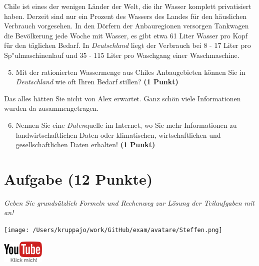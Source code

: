 \documentclass[a4paper, 9pt]{scrartcl}\usepackage[]{graphicx}\usepackage[]{xcolor}
\begin{document}
Chile ist eines der wenigen Länder der Welt, die ihr Wasser komplett privatisiert haben. Derzeit sind nur ein Prozent des Wassers des Landes für den häuslichen Verbrauch vorgesehen. In den Dörfern der Anbauregionen versorgen Tankwagen die Bevölkerung jede Woche mit Wasser, es gibt etwa 61 Liter Wasser pro Kopf für den täglichen Bedarf. In \textit{Deutschland} liegt der Verbrauch bei 8 - 17 Liter pro Sp{"u}lmaschinenlauf und 35 - 115 Liter pro Waschgang einer Waschmaschine.

\begin{enumerate}
  \setcounter{enumi}{4}
\item Mit der rationierten Wassermenge aus Chiles Anbaugebieten können Sie in \textit{Deutschland} wie oft Ihren Bedarf stillen? \textbf{(1 Punkt)}
\end{enumerate}

Das alles hätten Sie nicht von Alex erwartet. Ganz schön viele Informationen wurden da zusammengetragen.

\begin{enumerate}
  \setcounter{enumi}{5}  
  \item Nennen Sie eine \textit{Daten}quelle im Internet, wo Sie mehr Informationen zu landwirtschaftlichen Daten oder klimatischen, wirtschaftlichen und gesellschaftlichen Daten erhalten! \textbf{(1 Punkt)}
\end{enumerate} 
\clearpage

\section{Aufgabe \hfill (12 Punkte)}

\textit{Geben Sie grundsätzlich Formeln und Rechenweg zur Lösung der Teilaufgaben mit an!} \\[1Ex]
 

 
\begin{minipage}[t]{0.5\textwidth}
\texttt{[image: /Users/kruppajo/work/GitHub/exam/avatare/Steffen.png]}
\end{minipage}
\begin{minipage}[t]{0.5\textwidth}
\hfill
\href{https://youtu.be/WZSxntiNF8s}{\includegraphics[width = 2cm]{img/youtube}}
\end{minipage}
\end{document}

